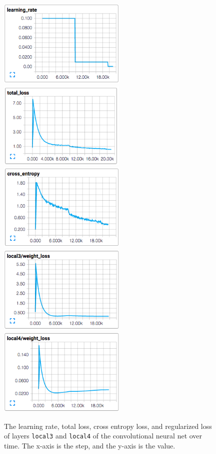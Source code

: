 \documentclass[10pt, twocolumn, twoside]{article}
\begin{document}
\begin{figure}[htbp]
	\centering
	\includegraphics[width=2.4in]{learning_rate}
	\includegraphics[width=2.4in]{total_loss}
	\includegraphics[width=2.4in]{cross_entropy}
	\includegraphics[width=2.4in]{local3_loss}
	\includegraphics[width=2.4in]{local4_loss}
	\caption{The learning rate, total loss, cross entropy loss, and regularized loss of layers \texttt{local3} and \texttt{local4} of the convolutional neural net over time. The x-axis is the step, and the y-axis is the value.}
	\label{fig:cnnloss}
\end{figure}
\end{document}
